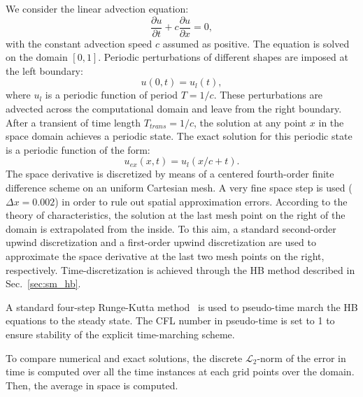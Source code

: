 
We consider the linear advection equation:
\begin{equation}
  \label{eq:convection}
  \frac{\partial u}{\partial t} + c \frac{\partial u}{\partial x} = 0,
\end{equation}
with the constant advection speed $c$ assumed as positive. 
The equation is solved on the domain $[0, 1]$. 
Periodic perturbations of different shapes are imposed at the left boundary:
\begin{equation}
   u(0, t) = u_l (t),
\end{equation}
where $u_l$ is a periodic function of period $T=1/c$.
These perturbations are advected across the computational 
domain and leave from the right boundary. After a transient of time length $T_{trans}=1/c$, 
the solution at any point $x$ in the space domain achieves a periodic state. 
The exact solution for this periodic state is a periodic function of the form:
\begin{equation}
    u_{ex}(x,t)=u_l(x/c+t).
\end{equation}
The space derivative is discretized by means of a centered 
fourth-order finite difference scheme on an uniform Cartesian mesh. 
A very fine space step is used ($\Delta x=0.002$) in order to rule 
out spatial approximation errors. According to the theory 
of characteristics, the solution at the last mesh 
point on the right of the domain is extrapolated 
from the inside. To this aim, a standard second-order 
upwind discretization and a first-order upwind discretization 
are used to approximate the space derivative at 
the last two mesh points on the right, respectively.
Time-discretization is achieved 
through the HB method described in Sec.~\ref{sec:sm_hb}.

A standard four-step Runge-Kutta method~\cite{Jameson1981}
is used to pseudo-time 
march the HB equations to the steady state.
The CFL number in pseudo-time is set to 1 
to ensure stability of the explicit time-marching scheme.

To compare numerical and exact solutions, 
the discrete $\mathcal{L}_2$-norm of the error 
in time is computed over all the time instances
at each grid points over the domain.
Then, the average in 
space is computed.

